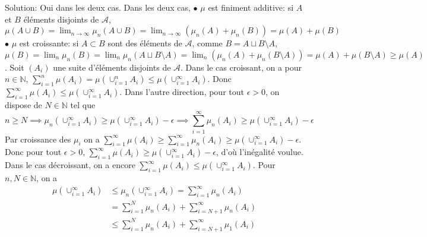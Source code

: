 \documentclass{report}
\begin{document}
\subsection{}  \\

Solution: Oui dans les deux cas. Dans les deux cas, \newline $\bullet$ $\mu$ est finiment additive: si $A$ et $B$ éléments disjoints de $\mathcal A$, $\mu(A\cup B) = \lim_{n\to \infty} \mu_n(A\cup B) =  \lim_{n\to \infty} (\mu_n(A)+\mu_n(B)) =\mu(A) + \mu(B)$\newline
$\bullet$ $\mu$ est croissante: si $A\subset B$ sont des éléments de $\mathcal A$, comme $B=A\sqcup B\setminus A$, $\mu(B) = \lim_n \mu_n(B)  = \lim_n \mu_n(A\sqcup B\setminus A) = \lim_n (\mu_n(A)+ \mu_n(B\setminus A)) = \mu(A)+\mu(B\setminus A) \geq \mu(A)$. \newline \newline
Soit $(A_i)$ une suite d'éléments disjoints de $\mathcal A$. \newline 
Dans le cas croissant, on a pour $n\in \mathbb N$, $\sum_{i=1}^n\mu(A_i) = \mu( \cup_{i=1}^n A_i) \leq \mu( \cup_{i=1}^\infty A_i)$. \newline Donc $\sum_{i=1}^\infty \mu(A_i) \leq \mu( \cup_{i=1}^\infty A_i)$. \newline
Dans l'autre direction, pour tout $\epsilon >0$, on dispose de $N\in \mathbb N$ tel que $$n\geq  N \implies \mu_n(\cup_{i=1}^\infty A_i)\geq \mu(\cup_{i=1}^\infty A_i)-\epsilon \implies \sum_{i=1}^\infty \mu_n(A_i)\geq \mu(\cup_{i=1}^\infty A_i)-\epsilon$$
Par croissance des $\mu_i$ on a $\sum_{i=1}^\infty \mu(A_i) \geq \sum_{i=1}^\infty \mu_n(A_i) \geq \mu(\cup_{i=1}^\infty A_i)-\epsilon$. \newline
Donc pour tout $\epsilon >0$, $\sum_{i=1}^\infty \mu(A_i) \geq \mu(\cup_{i=1}^\infty A_i)-\epsilon$, d'où l'inégalité voulue. \newline \newline
Dans le cas décroissant, on a encore $\sum_{i=1}^\infty \mu(A_i) \leq \mu( \cup_{i=1}^\infty A_i)$. \newline Pour $n, N \in \mathbb N$, on a $$\begin{aligned} \mu(\cup_{i=1}^\infty A_i) &\leq \mu_n(\cup_{i=1}^\infty A_i)  = \sum_{i=1}^\infty \mu_n(A_i)\\ &=\sum_{i=1}^N \mu_n(A_i)  + \sum_{i=N+1}^\infty \mu_n(A_i)\\ &\leq \sum_{i=1}^N \mu_n(A_i)  + \sum_{i=N+1}^\infty \mu_1(A_i) \end{aligned}$$
\end{document}
